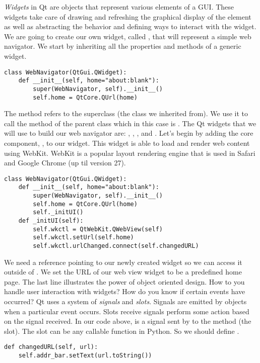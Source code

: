 \emph{Widgets} in Qt are objects that represent various elements of a GUI.
These widgets take care of drawing and refreshing the graphical display of the element as well as abstracting the behavior and defining ways to interact with the widget.
We are going to create our own widget, called , that will represent a simple web navigator.
We start by inheriting all the properties and methods of a generic widget.
\begin{lstlisting}
class WebNavigator(QtGui.QWidget):
    def __init__(self, home="about:blank"):
        super(WebNavigator, self).__init__()
        self.home = QtCore.QUrl(home)
\end{lstlisting}
The  method refers to the superclass (the class we inherited from).
We use it to call the  method of the parent class which in this case is .
The Qt widgets that we will use to build our web navigator are: , , , and .
Let's begin by adding the core component, , to our widget.
This widget is able to load and render web content using WebKit.
WebKit is a popular layout rendering engine that is used in Safari and Google Chrome (up til version 27).
\begin{lstlisting}
class WebNavigator(QtGui.QWidget):
    def __init__(self, home="about:blank"):
        super(WebNavigator, self).__init__()
        self.home = QtCore.QUrl(home)
        self._initUI()
    def _initUI(self):
        self.wkctl = QtWebKit.QWebView(self)
        self.wkctl.setUrl(self.home)
        self.wkctl.urlChanged.connect(self.changedURL)
\end{lstlisting}
We need a reference pointing to our newly created  widget so we can access it outside of .
We set the URL of our web view widget to be a predefined home page.  
The last line illustrates the power of object oriented design.
How to you handle user interaction with widgets?
How do you know if certain events have occurred?
Qt uses a system of \emph{signals} and \emph{slots}.
Signals are emitted by objects when a particular event occurs.
Slots receive signals perform some action based on the signal received.
In our code above,  is a signal sent by  to the method  (the slot).
The slot can be any callable function in Python.
So we should define .
\begin{lstlisting}
def changedURL(self, url):
    self.addr_bar.setText(url.toString())
\end{lstlisting}

